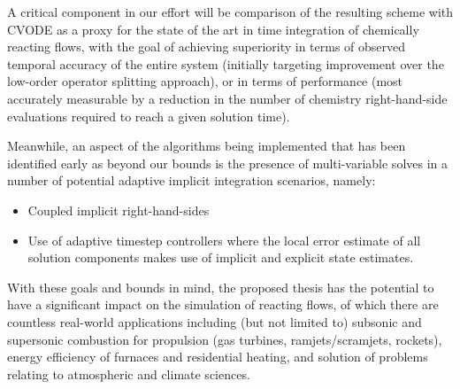 A critical component in our effort will be comparison of the resulting scheme with CVODE as
a proxy for the state of the art in time integration of chemically reacting
flows, with the goal of achieving superiority in terms of observed temporal accuracy
of the entire system (initially targeting improvement over the low-order operator splitting approach),
or in terms of performance (most accurately measurable by a reduction in the number of chemistry
right-hand-side evaluations required to reach a given solution time).

Meanwhile, an aspect of the algorithms being implemented that has been identified
early as beyond our bounds is the presence of multi-variable solves in a number of
potential adaptive implicit integration scenarios, namely:
\begin{itemize}
\item{Coupled implicit right-hand-sides}
\item{Use of adaptive timestep controllers where the local error estimate
      of all solution components makes use of implicit and explicit state
      estimates.}
\end{itemize}
With these goals and bounds in mind, the proposed thesis has the potential to
have a significant impact on the simulation of reacting flows, of which there
are countless real-world applications including (but not limited to) subsonic
and supersonic combustion for propulsion (gas turbines, ramjets/scramjets,
rockets), energy efficiency of furnaces and residential heating, and
solution of problems relating to atmospheric and climate sciences.


